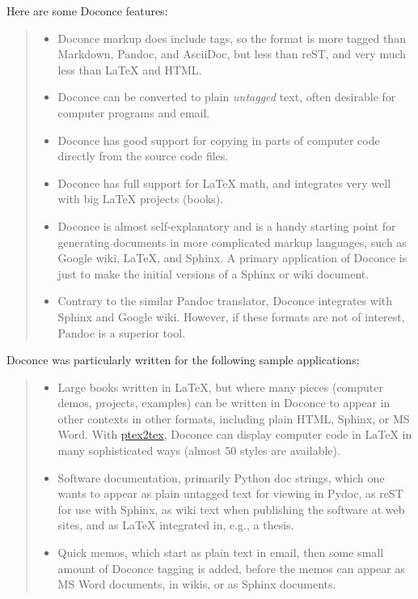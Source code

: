 \documentclass[a4paper]{article}
\begin{document}
Here are some Doconce features:
%
\begin{quote}
%
\begin{itemize}

\item Doconce markup does include tags, so the format is more tagged than
Markdown, Pandoc, and AsciiDoc, but less than reST, and very much
less than LaTeX and HTML.

\item Doconce can be converted to plain \emph{untagged} text,
often desirable for computer programs and email.

\item Doconce has good support for copying in parts of computer code
directly from the source code files.

\item Doconce has full support for LaTeX math, and integrates very well
with big LaTeX projects (books).

\item Doconce is almost self-explanatory and is a handy starting point
for generating documents in more complicated markup languages, such
as Google wiki, LaTeX, and Sphinx. A primary application of Doconce
is just to make the initial versions of a Sphinx or wiki document.

\item Contrary to the similar Pandoc translator, Doconce integrates with
Sphinx and Google wiki. However, if these formats are not of interest,
Pandoc is a superior tool.

\end{itemize}

\end{quote}

Doconce was particularly written for the following sample applications:
%
\begin{quote}
%
\begin{itemize}

\item Large books written in LaTeX, but where many pieces (computer demos,
projects, examples) can be written in Doconce to appear in other
contexts in other formats, including plain HTML, Sphinx, or MS Word.
With \href{http://code.google.com/p/ptex2tex}{ptex2tex}, Doconce can
display computer code in LaTeX in many sophisticated ways (almost
50 styles are available).

\item Software documentation, primarily Python doc strings, which one wants
to appear as plain untagged text for viewing in Pydoc, as reST
for use with Sphinx, as wiki text when publishing the software at
web sites, and as LaTeX integrated in, e.g., a thesis.

\item Quick memos, which start as plain text in email, then some small
amount of Doconce tagging is added, before the memos can appear as
MS Word documents, in wikis, or as Sphinx documents.

\end{itemize}

\end{quote}
\end{document}

